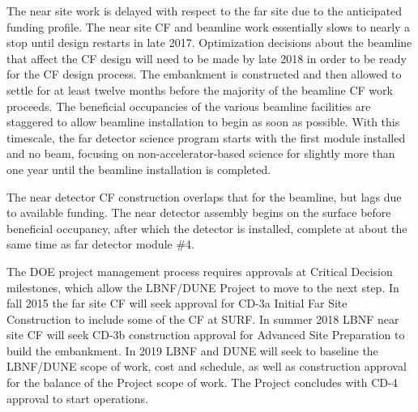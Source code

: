 The near site work is delayed with respect to the far site due to the anticipated funding profile. The near site CF and beamline work essentially slows to nearly a stop 
until design restarts in late 2017. Optimization decisions about the beamline that affect the CF design will need to be made by late 2018 in order to be ready for the CF design process. The embankment is constructed and then allowed to settle for at least twelve months before the majority of the beamline CF work proceeds. The beneficial occupancies of the various beamline facilities  
are staggered to allow beamline installation to begin as soon as possible. With this timescale, the far detector science program  
starts with the first module installed and no beam, focusing on non-accelerator-based science  
for slightly more than one year until 
the beamline installation is completed.


The near detector CF construction overlaps that for the beamline, but lags due to available funding. The near detector assembly begins on the surface before beneficial occupancy, after which the detector is installed, complete at about the same time as far detector module \#4. 

The DOE project management process requires approvals at Critical Decision milestones, which allow the LBNF/DUNE Project to move to the next step. In fall 2015 the far site CF will seek approval for CD-3a Initial Far Site Construction to include some of the CF at SURF. In summer 2018 LBNF near site CF will seek CD-3b construction approval for Advanced Site Preparation to build the embankment. In 2019  LBNF and DUNE will seek to baseline the LBNF/DUNE scope of work, cost and schedule, as well as construction approval for the balance of the Project scope of work. 
The Project concludes with CD-4 approval to start operations.


